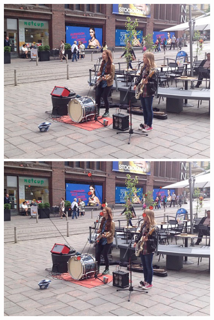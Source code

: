 \begin{figure}[H]
\centering
\begin{minipage}{.45\textwidth}
  \centering
  \includegraphics[width=1\linewidth]{guitar.jpg}
\end{minipage}%
\hspace{.5cm}
\begin{minipage}{.45\textwidth}
  \centering
  \includegraphics[width=1\linewidth]{sample-fixations.jpg}
\end{minipage}
\end{figure}

